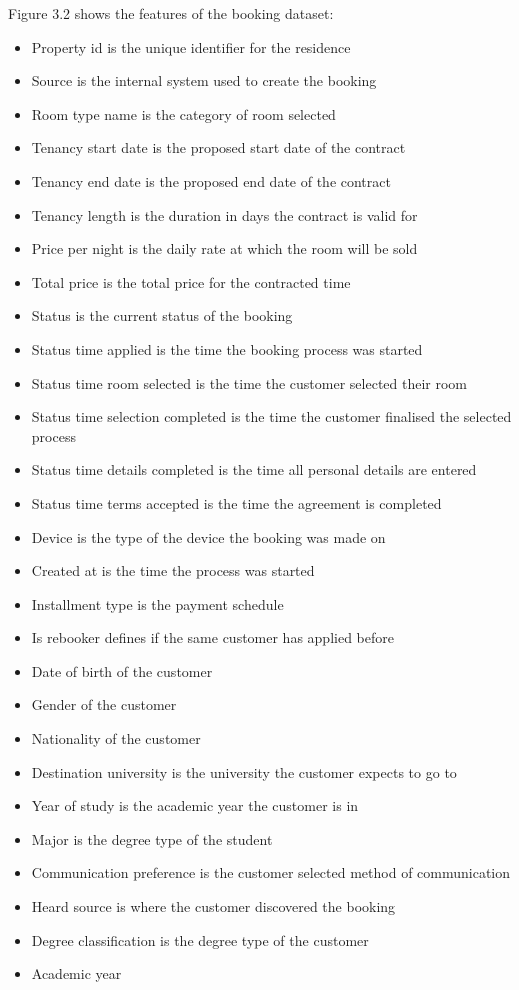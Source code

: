 Figure 3.2 shows the features of the booking dataset:

\begin{itemize}
    \item Property id is the unique identifier for the residence 
    \item Source is the internal system used to create the booking
    \item Room type name is the category of room selected
    \item Tenancy start date is the proposed start date of the contract
    \item Tenancy end date is the proposed end date of the contract
    \item Tenancy length is the duration in days the contract is valid for
    \item Price per night is the daily rate at which the room will be sold
    \item Total price is the total price for the contracted time
    \item Status is the current status of the booking
    \item Status time applied is the time the booking process was started
    \item Status time room selected is the time the customer selected their room
    \item Status time selection completed is the time the customer finalised the selected process 
    \item Status time details completed is the time all personal details are entered
    \item Status time terms accepted is the time the agreement is completed
    \item Device is the type of the device the booking was made on
    \item Created at is the time the process was started
    \item Installment type is the payment schedule
    \item Is rebooker defines if the same customer has applied before
    \item Date of birth of the customer
    \item Gender of the customer
    \item Nationality of the customer
    \item Destination university is the university the customer expects to go to
    \item Year of study is the academic year  the customer is in
    \item Major is the degree type of the student
    \item Communication preference is the customer selected method of communication
    \item Heard source is where the customer discovered the booking
    \item Degree classification is the degree type of the customer
    \item Academic year
\end{itemize}

